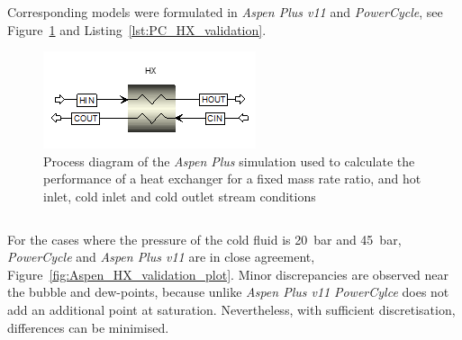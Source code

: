             Corresponding models were formulated in \emph{Aspen Plus v11} and \emph{PowerCycle}, see Figure~\ref{fig:Aspen_HX_validation} and Listing~\ref{lst:PC_HX_validation}.
            
            \begin{figure}[H]
                \centering
                \includegraphics{Content/PowerCycle/Figures/AspenPlus_HXValidation.png}
                \caption[Process diagram of the \emph{Aspen Plus} simulation used to calculate the performance of a heat exchanger.]{Process diagram of the \emph{Aspen Plus} simulation used to calculate the performance of a heat exchanger for a fixed mass rate ratio, and hot inlet, cold inlet and cold outlet stream conditions}
                \label{fig:Aspen_HX_validation}
            \end{figure}


            \begin{table}[H]
                \caption{The boundary conditions for the heat exchanger performance calculation validation for scenario 1}
                \centering 
                \label{table:HX_validation_inputs}
                
            \end{table}
        
            \begin{listing}[H]
                \caption{Configuration of a heat exchanger performance calculation in \emph{PowerCycle} for a fixed mass rate ratio, and hot inlet, cold inlet and cold outlet stream conditions}
                \inputminted[bgcolor=bg,linenos, fontsize=\footnotesize]{python}{Content/PowerCycle/Code/HeatExchangerPerf_snippet.py}
                \label{lst:PC_HX_validation}
                \vspace{-20pt}
            \end{listing}
    
            For the cases where the pressure of the cold fluid is \qty{20}{\bar} and \qty{45}{\bar}, \emph{PowerCycle} and \emph{Aspen Plus v11} are in close agreement, Figure~\ref{fig:Aspen_HX_validation_plot}. Minor discrepancies are observed near the bubble and dew-points, because unlike \emph{Aspen Plus v11} \emph{PowerCylce} does not add an additional point at saturation. Nevertheless,  with sufficient discretisation, differences can be minimised.


